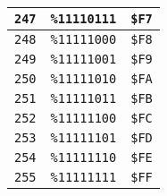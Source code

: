 \begin{multicols}{2}
\begin{center}
\begin{tabular}{|c|c|c|}
 \texttt{247} & \texttt{\%11110111} &  \texttt{\$F7} \\ \hline
 \texttt{248} & \texttt{\%11111000} &  \texttt{\$F8} \\ \hline
 \texttt{249} & \texttt{\%11111001} &  \texttt{\$F9} \\ \hline
 \texttt{250} & \texttt{\%11111010} &  \texttt{\$FA} \\ \hline
 \texttt{251} & \texttt{\%11111011} &  \texttt{\$FB} \\ \hline
 \texttt{252} & \texttt{\%11111100} &  \texttt{\$FC} \\ \hline
 \texttt{253} & \texttt{\%11111101} &  \texttt{\$FD} \\ \hline
 \texttt{254} & \texttt{\%11111110} &  \texttt{\$FE} \\ \hline
 \texttt{255} & \texttt{\%11111111} &  \texttt{\$FF} \\ \hline
	\end{tabular}
\end{center}
\end{multicols}

\vspace*{\fill}

\normalsize

\cleardoublepage

